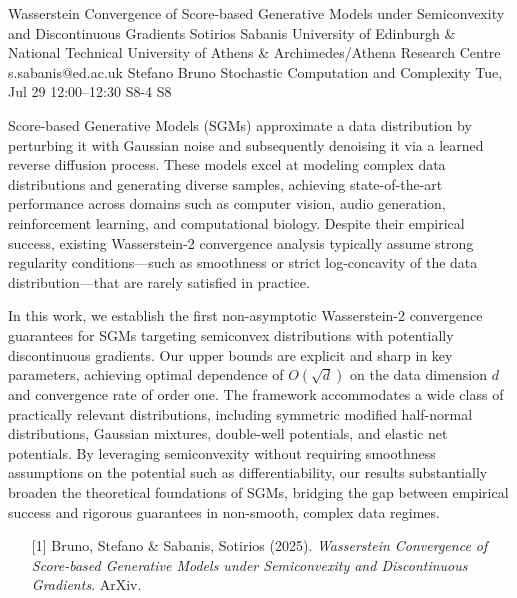 \begin{talk}
  {Wasserstein Convergence of Score-based Generative Models under Semiconvexity and Discontinuous Gradients}%
  {Sotirios Sabanis}%
  {University of Edinburgh \& National Technical University of Athens \& Archimedes/Athena Research Centre}%
  {s.sabanis@ed.ac.uk}%
  {Stefano Bruno}%
  {Stochastic Computation and Complexity}%
  {Tue, Jul 29 12:00–12:30}%
  {S8-4}%
  {S8}%
				
			
\noindent Score-based Generative Models (SGMs) approximate a data distribution by perturbing it with Gaussian noise and subsequently denoising it via a learned reverse diffusion process. These models excel at modeling complex data distributions and generating diverse samples, achieving state-of-the-art performance across domains such as computer vision, audio generation, reinforcement learning, and computational biology. Despite their empirical success, existing Wasserstein-2 convergence analysis typically assume strong regularity conditions—such as smoothness or strict log-concavity of the data distribution—that are rarely satisfied in practice.
		
	\noindent	In this work, we establish the first non-asymptotic Wasserstein-2 convergence guarantees for SGMs targeting semiconvex distributions with potentially discontinuous gradients. Our upper bounds are explicit and sharp in key parameters, achieving optimal dependence of $O(\sqrt{d})$ on the data dimension $d$ and convergence rate of order one. The framework accommodates a wide class of practically relevant distributions, including symmetric modified half-normal distributions, Gaussian mixtures, double-well potentials, and elastic net potentials. By leveraging semiconvexity without requiring smoothness assumptions on the potential such as differentiability, our results substantially broaden the theoretical foundations of SGMs, bridging the gap between empirical success and rigorous guarantees in non-smooth, complex data regimes.

\medskip


\begin{enumerate}
	\item[{[1]}] Bruno, Stefano \& Sabanis, Sotirios (2025). {\it Wasserstein Convergence of Score-based Generative Models under Semiconvexity and Discontinuous Gradients}. ArXiv.
\end{enumerate}


\end{talk}

